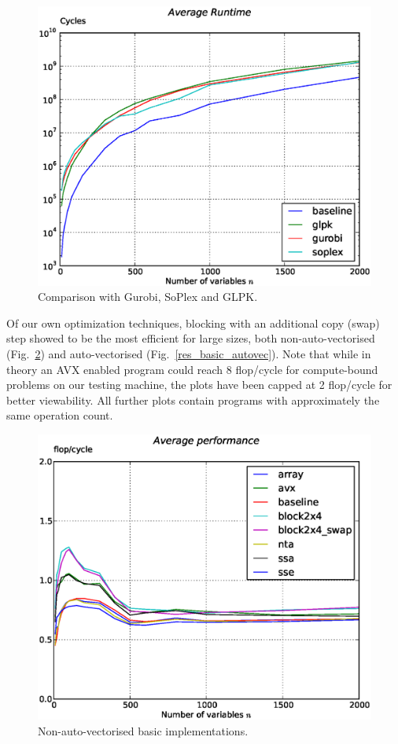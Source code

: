 \documentclass[letterpaper]{article}
\begin{document}
\begin{figure}\centering
  \includegraphics[scale=0.4]{img/results_compare_external.eps}
  \caption{Comparison with Gurobi, SoPlex and GLPK.\label{res_external}}
\end{figure}


Of our own optimization techniques, blocking with an additional copy (swap) step showed to be the most efficient for large sizes,
both non-auto-vectorised (Fig.~\ref{res_basic_novec}) and auto-vectorised (Fig.~\ref{res_basic_autovec}).
Note that while in theory an AVX enabled program could reach 8 flop/cycle for compute-bound problems on our testing machine, the plots have been capped at 2 flop/cycle for better viewability.
All further plots contain programs with approximately the same operation count.

\begin{figure}\centering
  \includegraphics[scale=0.4]{img/results_basic_novec.eps}
  \caption{Non-auto-vectorised basic implementations.\label{res_basic_novec}}
\end{figure}
\end{document}

